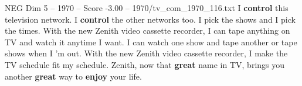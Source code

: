 \begin{textsample}{NEG Dim 5 – 1970 – Score -3.00 – 1970/tv\_com\_1970\_116.txt}  \label{ex:f5_neg_053}
I \textbf{control} this television network.
I \textbf{control} the other networks too.
I pick the shows and I pick the times.
With the new Zenith video cassette recorder, I can tape anything on TV and watch it anytime I want.
I can watch one show and tape another or tape shows when I 'm out.
With the new Zenith video cassette recorder, I make the TV schedule fit my schedule.
Zenith, now that \textbf{great} name in TV, brings you another \textbf{great} way to \textbf{enjoy} your life.

\end{textsample}
